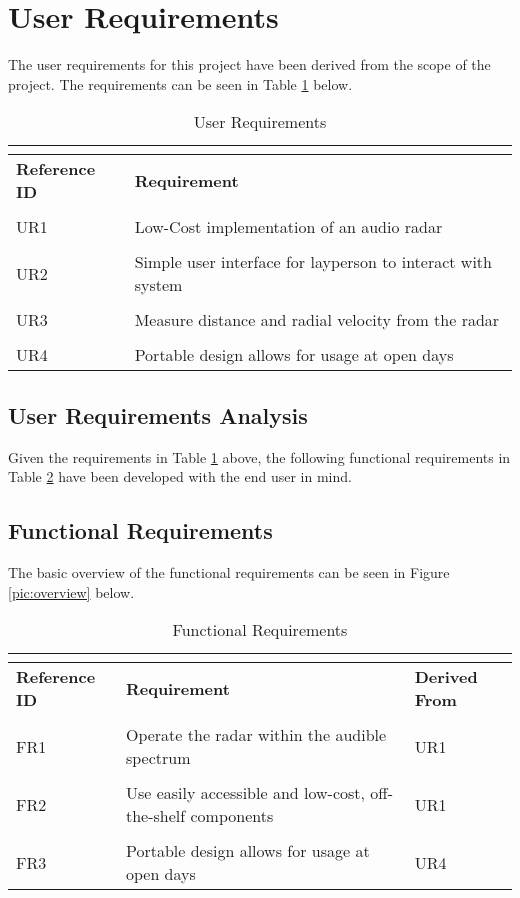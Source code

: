 \section{User Requirements\label{UserReqs}}
The user requirements for this project have been derived from the scope of the project. The requirements can be seen in Table \ref{table:UserReqs} below.

\begin{table}[h!]
    \begin{tabular}{ p{3cm} p{12.25cm} }
         \multicolumn{2}{c}{} \\
         \hline
         \textbf{Reference ID} & \textbf{Requirement} \\
         \hline
         \\ UR1 & Low-Cost implementation of an audio radar \\
         \\ UR2 & Simple user interface for layperson to interact with system \\
         \\ UR3 & Measure distance and radial velocity from the radar \\
         \\ UR4 & Portable design allows for usage at open days \\
         \hline
    \end{tabular}
    \caption{User Requirements}
    \label{table:UserReqs}
\end{table}

\subsection{User Requirements Analysis}

Given the requirements in Table \ref{table:UserReqs} above, the following functional requirements in Table \ref{table:FuncReqs} have been developed with the end user in mind.

\subsection{Functional Requirements}
The basic overview of the functional requirements can be seen in Figure \ref{pic:overview} below.
\begin{table}[h!]
    \begin{tabular}{ p{3cm}p{8.75cm}p{3cm} }
         \multicolumn{3}{c}{} \\
         \hline
         \textbf{Reference ID} & \textbf{Requirement} & \textbf{Derived From} \\
         \hline
        \\  FR1 & Operate the radar within the audible spectrum & UR1\\
         \\ FR2 & Use easily accessible and low-cost, off-the-shelf components & UR1\\
         \\ FR3 & Portable design allows for usage at open days & UR4\\
         \hline
    \end{tabular}
    \caption{Functional Requirements}
    \label{table:FuncReqs}
\end{table}

